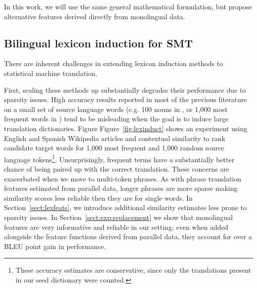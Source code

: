 \documentclass[11pt]{article}
\newcommand{\secref}[1]{Section~\ref{#1}}
\newcommand{\figref}[1]{Figure~\ref{#1}}
\begin{document}
In this work, we will use the same general mathematical formulation, but propose alternative features derived directly from monolingual data.

 \subsection{Bilingual lexicon induction for SMT} \label{sect:bckg:lexind}
 
There are inherent challenges in extending lexicon induction methods to statistical machine translation.  

First, scaling these methods up substantially degrades their performance due to sparsity issues. High accuracy results reported in most of the previous literature on a small set of source language words (e.g. 100 nouns in \cite{Rapp:1995}, or 1,000 most frequent words in \cite{Koehn:2002}) tend to be misleading when the goal is to induce large translation dictionaries.  Figure \figref{fig:lexinduct} shows an experiment using English and Spanish Wikipedia articles and contextual similarity to rank candidate target words for 1,000 most frequent and 1,000 random source language tokens\footnote{These accuracy estimates are conservative, since only the translations present in our seed dictionary were counted.}.  Unsurprisingly, frequent terms have a substantially better chance of being paired up with the correct translation.  These concerns are exacerbated when we move to multi-token phrases.  As with phrase translation features estimated from parallel data, longer phrases are more sparse making similarity scores less reliable then they are for single words.  In \secref{sect:lexfeats}, we introduce additional similarity estimates less prone to sparsity issues.  In \secref{sect:exp:replacement} we show that monolingual features are very informative and reliable in our setting; even when added alongside the feature functions derived from parallel data, they account for over a BLEU point gain in performance.
\end{document}
